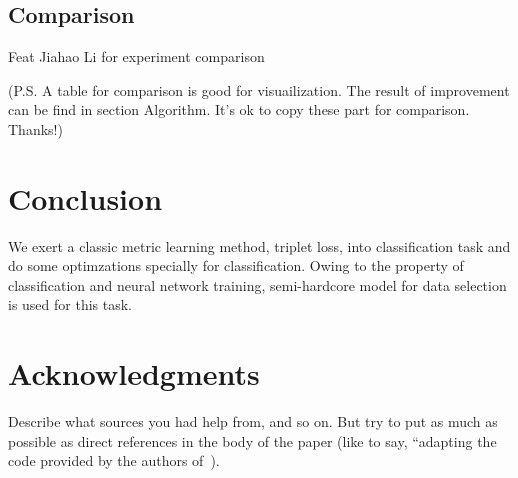 \documentclass[10pt,twocolumn,letterpaper]{article}
\begin{document}
\subsection{Comparison}

Feat Jiahao Li for experiment comparison

(P.S. A table for comparison is good for visuailization. The result of improvement can be find in section Algorithm. It's ok to copy these part for comparison. Thanks!)

\section{Conclusion}
We exert a classic metric learning method, triplet loss, into classification task and do some optimzations specially for classification. Owing to the property of classification and neural network training, semi-hardcore model for data selection is used for this task. 

\section*{Acknowledgments}
Describe what sources you had help from, and so on. But try to put as much as possible as direct references in the body of the paper (like to say, ``adapting the code provided by the authors of~\cite{blah}).

{\small

}
\end{document}

